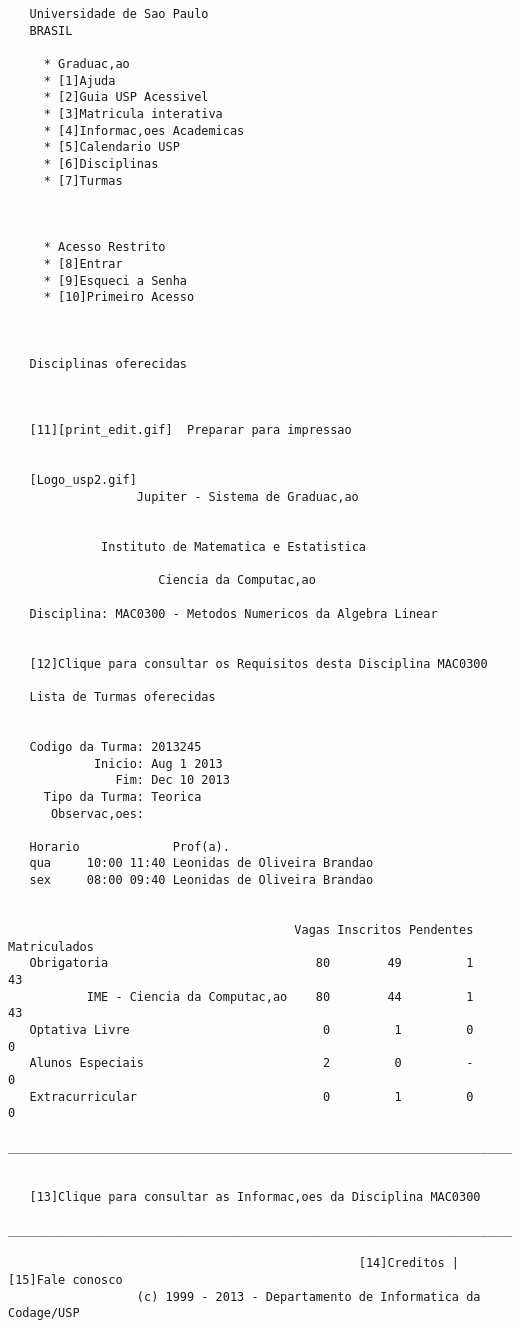 \documentclass[brazil]{article}
\begin{document}
\begin{small}
\begin{verbatim}
   Universidade de Sao Paulo
   BRASIL

     * Graduac,ao
     * [1]Ajuda
     * [2]Guia USP Acessivel
     * [3]Matricula interativa
     * [4]Informac,oes Academicas
     * [5]Calendario USP
     * [6]Disciplinas
     * [7]Turmas



     * Acesso Restrito
     * [8]Entrar
     * [9]Esqueci a Senha
     * [10]Primeiro Acesso



   Disciplinas oferecidas



   [11][print_edit.gif]  Preparar para impressao


   [Logo_usp2.gif]
                  Jupiter - Sistema de Graduac,ao


             Instituto de Matematica e Estatistica

                     Ciencia da Computac,ao

   Disciplina: MAC0300 - Metodos Numericos da Algebra Linear


   [12]Clique para consultar os Requisitos desta Disciplina MAC0300

   Lista de Turmas oferecidas


   Codigo da Turma: 2013245
            Inicio: Aug 1 2013
               Fim: Dec 10 2013
     Tipo da Turma: Teorica
      Observac,oes:

   Horario             Prof(a).
   qua     10:00 11:40 Leonidas de Oliveira Brandao
   sex     08:00 09:40 Leonidas de Oliveira Brandao


                                        Vagas Inscritos Pendentes Matriculados
   Obrigatoria                             80        49         1           43
           IME - Ciencia da Computac,ao    80        44         1           43
   Optativa Livre                           0         1         0            0
   Alunos Especiais                         2         0         -            0
   Extracurricular                          0         1         0            0
        ______________________________________________________________________________________


   [13]Clique para consultar as Informac,oes da Disciplina MAC0300
     ______________________________________________________________________________________

                                                 [14]Creditos | [15]Fale conosco
                  (c) 1999 - 2013 - Departamento de Informatica da Codage/USP


\end{verbatim}
\end{small}
\end{document}
